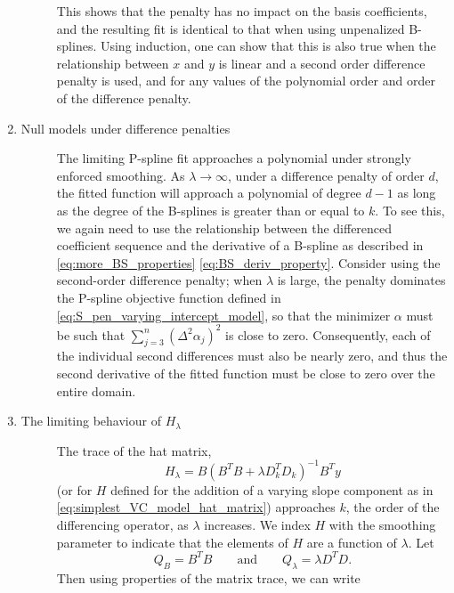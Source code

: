 \documentclass[12pt]{article}
\begin{document}
\begin{enumerate}
\begin{description}
This shows that the penalty has no impact on the basis coefficients, and the resulting fit is identical to that when using unpenalized B-splines. Using induction, one can show that this is also true when the relationship between $x$ and $y$ is linear and a second order difference penalty is used, and for any values of the polynomial order and order of the difference penalty.\end{description}
\item \begin{description}\item[Null models under difference penalties] \label{eq:PS_property_3}
The limiting P-spline fit approaches a polynomial under strongly enforced smoothing. As $\lambda \rightarrow \infty$, under a difference penalty of order $d$, the fitted function will approach a polynomial of degree $d-1$ as long as the degree of the B-splines is greater than or equal to $k$. To see this, we again need to use the relationship between the differenced coefficient sequence and the derivative of a B-spline as described in \ref{eq:more_BS_properties} \ref{eq:BS_deriv_property}. Consider using the second-order difference penalty; when $\lambda$ is large, the penalty dominates the P-spline objective function defined in \ref{eq:S_pen_varying_intercept_model}, so that the minimizer $\alpha$ must be such that $\sum_{j=3}^n\left(\Delta^2\alpha_j\right)^2$ is close to zero. Consequently, each of the individual second differences must also be nearly zero, and thus the second derivative of the fitted function must be close to zero over the entire domain.
\end{description}
\item \begin{description}\item[The limiting behaviour of $H_\lambda$] The trace of the hat matrix, 
\[
H_\lambda = B\left(B^TB + \lambda D_k^TD_k\right)^{-1}B^Ty
\] 
(or for $H$ defined for the addition of a varying slope component as in \ref{eq:simplest_VC_model_hat_matrix}) approaches $k$, the order of the differencing operator, as $\lambda$ increases. We index $H$ with the smoothing parameter to indicate that the elements of $H$ are a function of $\lambda$. Let
\begin{equation}
Q_B = B^T B \qquad \mbox{and} \qquad Q_\lambda = \lambda D^T D.
\end{equation}
Then using properties of the matrix trace, we can write
\begin{align}
\begin{split}

\end{split}
\end{align}
\end{description}
\end{enumerate}
\end{document}
